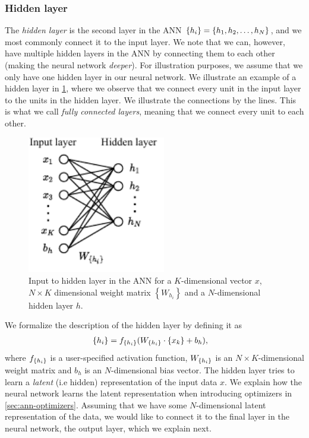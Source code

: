 \subsubsection{Hidden layer}
\label{sec:ann-hidden-layer}
The \textit{hidden layer} is the second layer in the ANN $\left\{ {h}_{i} \right\} = \left\{ h_1, h_2, \ldots, h_N \right\}$, and we most commonly connect it to the input layer. We note that we can, however, have multiple hidden layers in the ANN by connecting them to each other (making the neural network \textit{deeper}). For illustration purposes, we assume that we only have one hidden layer in our neural network. We illustrate an example of a hidden layer in \cref{fig:hidden_layer_ann}, where we observe that we connect every unit in the input layer to the units in the hidden layer. We illustrate the connections by the lines. This is what we call \textit{fully connected layers}, meaning that we connect every unit to each other.

\begin{figure}[H]
    \centering
    \includegraphics[height=6cm]{thesis/figures/artificial-neural-network-input-hidden-layer_cropped.pdf}
    \caption{Input to hidden layer in the ANN for a $K$-dimensional vector $x$, $N\times K$ dimensional weight matrix $\left\{ W_{h_i} \right\}$ and a $N$-dimensional hidden layer $h$.}
    \label{fig:hidden_layer_ann}
\end{figure}
We formalize the description of the hidden layer by defining it as
\begin{align}
    \label{eqn:hidden-layer-ann}
    \left\{ {h}_{i} \right\} &= f_{\left\{ {h}_{i} \right\}}(W_{\left\{ {h}_{i} \right\}} \cdot \left\{ {x}_{k} \right\} + b_h),
\end{align}
where $f_{\left\{ {h}_{i} \right\}}$ is a user-specified activation function, $W_{\left\{ {h}_{i} \right\}}$ is an $N \times K$-dimensional weight matrix and $b_h$ is an $N$-dimensional bias vector. The hidden layer tries to learn a \textit{latent} (i.e hidden) representation of the input data $x$. We explain how the neural network learns the latent representation when introducing optimizers in \cref{sec:ann-optimizers}. Assuming that we have some $N$-dimensional latent representation of the data, we would like to connect it to the final layer in the neural network, the output layer, which we explain next.

